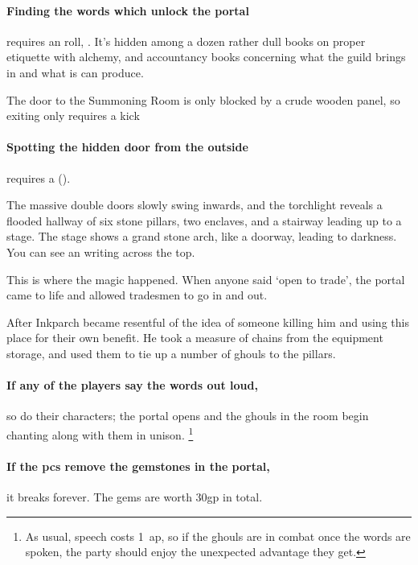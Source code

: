 \paragraph{Finding the words which unlock the portal}
requires an  roll, \tn[9].
It's hidden among a dozen rather dull books on proper etiquette with alchemy, and accountancy books concerning what the guild brings in and what is can produce.

The door to the Summoning Room is only blocked by a crude wooden panel, so exiting only requires a kick

\paragraph{Spotting the hidden door from the outside}
requires a  (\tn[8]).

\begin{boxtext}
  The massive double doors slowly swing inwards, and the torchlight reveals a flooded hallway of six stone pillars, two enclaves, and a stairway leading up to a stage.
  The stage shows a grand stone arch, like a doorway, leading to darkness.
  You can see an writing across the top.
\end{boxtext}


\begin{exampletext}
  This is where the magic happened.
  When anyone said `open to trade', the portal came to life and allowed tradesmen to go in and out.

  After Inkparch became resentful of the idea of someone killing him and using this place for their own benefit.
  He took a measure of chains from the equipment storage, and used them to tie up a number of ghouls to the pillars.
\end{exampletext}

\paragraph{If any of the players say the words out loud,}
so do their characters; the portal opens and the ghouls in the room begin chanting along with them in unison.%
\footnote{As usual, speech costs 1~\gls{ap}, so if the ghouls are in combat once the words are spoken, the party should enjoy the unexpected advantage they get.}

\paragraph{If the \glspl{pc} remove the gemstones in the portal,}
it breaks forever.
The gems are worth 30gp in total.

